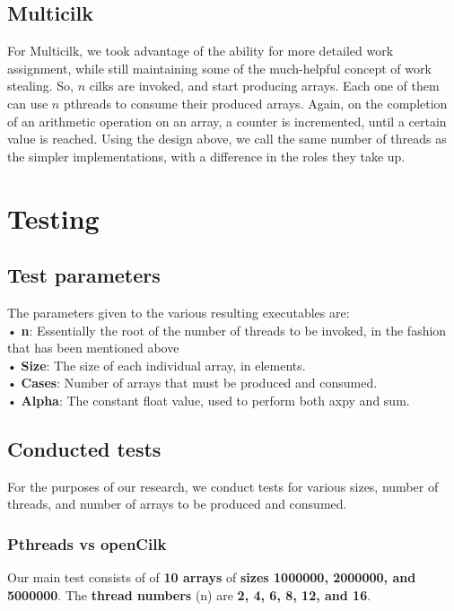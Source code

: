 \documentclass[11pt,a4paper,onecolumn,final]{article}
\begin{document}
\subsection{Multicilk}
For Multicilk, we took advantage of the ability for more detailed work assignment, while still maintaining some of the much-helpful concept of work stealing. So, $n$ cilks are invoked, and start producing arrays. Each one of them can use $n$ pthreads to consume their produced arrays. Again, on the completion of an arithmetic operation on an array, a counter is incremented, until a certain value is reached. Using the design above, we call the same number of threads as the simpler implementations, with a difference in the roles they take up.
\section{Testing}
\subsection{Test parameters}
The parameters given to the various resulting executables are:\\
• \textbf{n}: Essentially the root of the number of threads to be invoked, in the fashion that has been mentioned above\\
• \textbf{Size}: The size of each individual array, in elements.\\
• \textbf{Cases}: Number of arrays that must be produced and consumed.\\
• \textbf{Alpha}: The constant float value, used to perform both axpy and sum.\\
\subsection{Conducted tests}
For the purposes of our research, we conduct tests for various sizes, number of threads, and number of arrays to be produced and consumed.
\subsubsection{Pthreads vs openCilk}
Our main test consists of of \textbf{10 arrays} of \textbf{sizes 1000000, 2000000, and 5000000}. The \textbf{thread numbers} (n) are \textbf{2, 4, 6, 8, 12, and 16}. 
\end{document}
